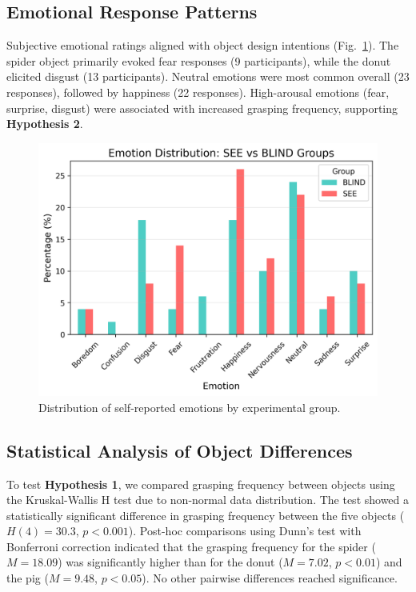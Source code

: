 \documentclass[conference]{IEEEtran}
\begin{document}
\subsection{Emotional Response Patterns}

Subjective emotional ratings aligned with object design intentions 
(Fig.~\ref{fig:emotion-dist}). The spider object primarily evoked fear 
responses (9 participants), while the donut elicited disgust (13 participants). 
Neutral emotions were most common overall (23 responses), followed by 
happiness (22 responses). High-arousal emotions (fear, surprise, disgust) 
were associated with increased grasping frequency, supporting \textbf{Hypothesis 2}.

\begin{figure}[!t]
    \centering
    \includegraphics[width=\columnwidth]{group_emotion_analysis.png}
    \caption{Distribution of self-reported emotions by experimental group.}
    \label{fig:emotion-dist}
\end{figure}

\subsection{Statistical Analysis of Object Differences}

To test \textbf{Hypothesis 1}, we compared grasping frequency between objects using the Kruskal-Wallis H test due to non-normal data distribution. The test showed a statistically significant difference in grasping frequency between the five objects ($H(4) = 30.3$, $p < 0.001$). Post-hoc comparisons using Dunn's test with Bonferroni correction indicated that the grasping frequency for the spider ($M=18.09$) was significantly higher than for the donut ($M=7.02$, $p < 0.01$) and the pig ($M=9.48$, $p < 0.05$). No other pairwise differences reached significance.
\end{document}
